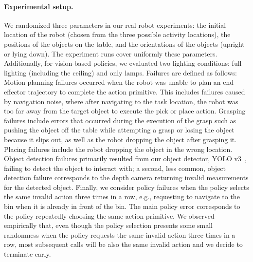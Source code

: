 \paragraph{Experimental setup.} We randomized three parameters in our real robot experiments: the initial location of the robot (chosen from the three possible activity locations), the positions of the objects on the table, and the orientations of the objects (upright or lying down). The experiment runs cover uniformly these parameters. Additionally, for vision-based policies, we evaluated two lighting conditions: full lighting (including the ceiling) and only lamps.
Failures are defined as follows:
Motion planning failures occurred when the robot was unable to plan an end effector trajectory to complete the action primitive. This includes failures caused by navigation noise, where after navigating to the task location, the robot was too far away from the target object to execute the pick or place action. 
Grasping failures include errors that occurred during the execution of the grasp such as pushing the object off the table while attempting a grasp or losing the object because it slips out, as well as the robot dropping the object after grasping it.
Placing failures include the robot dropping the object in the wrong location. 
Object detection failures primarily resulted from our object detector, YOLO v3~\cite{redmon2018yolov3}, failing to detect the object to interact with; a second, less common, object detection failure corresponds to the depth camera returning invalid measurements for the detected object. 
Finally, we consider policy failures when the policy selects the same invalid action three times in a row, e.g., requesting to navigate to the bin when it is already in front of the bin. The main policy error corresponds to the policy repeatedly choosing the same action primitive. We observed empirically that, even though the policy selection presents some small randomness when the policy requests the same invalid action three times in a row, most subsequent calls will be also the same invalid action and we decide to terminate early.


